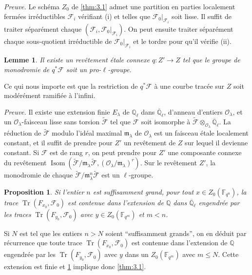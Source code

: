 \documentclass[11pt,a4paper]{article}
\theoremstyle{plain}
\newtheorem{lemma}[theorem]{Lemme}
\newtheorem{proposition}[theorem]{Proposition}
\theoremstyle{definition}
\DeclareMathOperator{\tr}{Tr}
\DeclareMathOperator{\Isom}{Isom}
\begin{document}
\noindent\textit{Preuve.} Le sch\'ema $Z_0$ de \ref{thm:3.1} admet une partition en parties localement ferm\'ees irr\'eductibles $\mathcal{F}_i$ v\'erifiant (i) et telles que $\mathcal{F}_0|_{\mathcal{F}_i}$ soit lisse. Il suffit de traiter s\'epar\'ement chaque $(\mathcal{F}_i, \mathcal{F}_0|_{\mathcal{F}_i})$. On peut ensuite traiter s\'epar\'ement chaque sous-quotient irr\'eductible de $\mathcal{F}_0|_{\mathcal{F}_i}$ et le tordre pour qu'il v\'erifie (ii).

\begin{lemma}\label{lem:3.3}
Il existe un rev\^etement \'etale connexe $q: Z' \to Z$ tel que le groupe de monodromie de $q^*\mathcal{F}$ soit un pro-$\ell$-groupe.
\end{lemma}

Ce qui nous importe est que la restriction de $q^*\mathcal{F}$ \`a une courbe trac\'ee sur $Z$ soit mod\'er\'ement ramifi\'ee \`a l'infini.

\noindent\textit{Preuve.} Il existe une extension finie $E_\lambda$ de $\mathbb{Q}_\ell$ dans $\overline{\mathbb{Q}}_\ell$, d'anneau d'entiers $\mathcal{O}_\lambda$, et un $\mathcal{O}_\lambda$-faisceau lisse sans torsion $\tilde{\mathcal{F}}$ tel que $\mathcal{F}$ soit isomorphe \`a $\tilde{\mathcal{F}} \otimes_{\mathcal{O}_\lambda} \overline{\mathbb{Q}}_\ell$. La r\'eduction de $\tilde{\mathcal{F}}$ modulo l'id\'eal maximal $\mathfrak{m}_\lambda$ de $\mathcal{O}_\lambda$ est un faisceau \'etale localement constant, et il suffit de prendre pour $Z'$ un rev\^etement de $Z$ sur lequel il devienne constant. Si $\mathcal{F}$ est de rang $r$, on peut prendre pour $Z'$ une composante connexe du rev\^etement $\Isom(\tilde{\mathcal{F}}/\mathfrak{m}_\lambda\tilde{\mathcal{F}}, (\mathcal{O}_\lambda/\mathfrak{m}_\lambda)^r)$. Sur le rev\^etement $Z'$, la monodromie de chaque $\tilde{\mathcal{F}}/\mathfrak{m}_\lambda^n\tilde{\mathcal{F}}$ est un $\ell$-groupe.

\begin{proposition}\label{prop:3.4}
Si l'entier $n$ est suffisamment grand, pour tout $x \in Z_0(\mathbb{F}_{q^n})$, la trace $\tr(F_{x_0}, \mathcal{F}_0)$ est contenue dans l'extension de $\mathbb{Q}$ dans $\overline{\mathbb{Q}}_\ell$ engendr\'ee par les traces $\tr(F_{y_0}, \mathcal{F}_0)$ avec $y \in Z_0(\mathbb{F}_{q^m})$ et $m < n$.
\end{proposition}

Si $N$ est tel que les entiers $n > N$ soient ``suffisamment grands'', on en d\'eduit par r\'ecurrence que toute trace $\tr(F_{x_0}, \mathcal{F}_0)$ est contenue dans l'extension de $\mathbb{Q}$ engendr\'ee par les $\tr(F_{y_0}, \mathcal{F}_0)$ avec $y$ dans un $Z_0(\mathbb{F}_{q^m})$ avec $m \leq N$. Cette extension est finie et \ref{prop:3.4} implique donc \ref{thm:3.1}.
\end{document}

